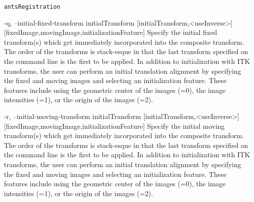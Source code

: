 \documentclass[ignorenonframetext,]{beamer}
\newenvironment{Shaded}{\begin{snugshade}}{\end{snugshade}}
\newcommand{\StringTok}[1]{\textcolor[rgb]{0.31,0.60,0.02}{{#1}}}
\begin{document}
\begin{frame}[fragile]{\texttt{antsRegistration}}
\begin{Shaded}
\begin{Highlighting}[]
\StringTok{     -q, --initial-fixed-transform initialTransform}
\StringTok{                                   [initialTransform,<useInverse>]}
\StringTok{                                   [fixedImage,movingImage,initializationFeature]}
\StringTok{          Specify the initial fixed transform(s) which get immediately incorporated into}
\StringTok{          the composite transform. The order of the transforms is stack-esque in that the}
\StringTok{          last transform specified on the command line is the first to be applied. In}
\StringTok{          addition to initialization with ITK transforms, the user can perform an initial}
\StringTok{          translation alignment by specifying the fixed and moving images and selecting an}
\StringTok{          initialization feature. These features include using the geometric center of the}
\StringTok{          images (=0), the image intensities (=1), or the origin of the images (=2).}

\StringTok{     -r, --initial-moving-transform initialTransform}
\StringTok{                                    [initialTransform,<useInverse>]}
\StringTok{                                    [fixedImage,movingImage,initializationFeature]}
\StringTok{          Specify the initial moving transform(s) which get immediately incorporated into}
\StringTok{          the composite transform. The order of the transforms is stack-esque in that the}
\StringTok{          last transform specified on the command line is the first to be applied. In}
\StringTok{          addition to initialization with ITK transforms, the user can perform an initial}
\StringTok{          translation alignment by specifying the fixed and moving images and selecting an}
\StringTok{          initialization feature. These features include using the geometric center of the}
\StringTok{          images (=0), the image intensities (=1), or the origin of the images (=2).}


\end{Highlighting}
\end{Shaded}
\end{frame}
\end{document}
